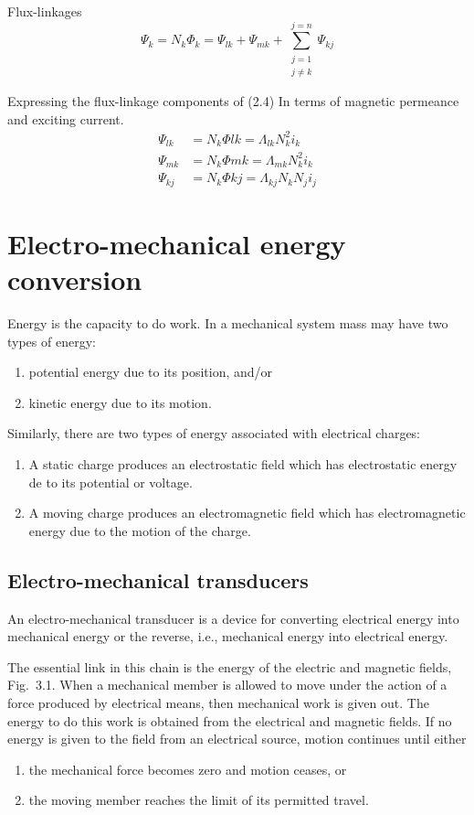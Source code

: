 \documentclass[a4paper,numbers=noenddot,12pt]{scrbook}
\begin{document}
Flux-linkages
\begin{equation}
    \varPsi_k = N_k \Phi_k = \varPsi_{lk} + \varPsi_{mk} + \sum_{\substack{j = 1\\j \neq k}}^{j = n} \varPsi_{kj}
    \label{eq:Eq2.4}
\end{equation}

Expressing the flux-linkage components of (2.4) In terms of magnetic permeance and exciting current.
\begin{align}
    \varPsi_{lk} & = N_k \Phi{lk} = \Lambda_{lk} N_k^2 i_k \\
    \varPsi_{mk} & = N_k \Phi{mk} = \Lambda_{mk} N_k^2 i_k \\
    \varPsi_{kj} & = N_k \Phi{kj} = \Lambda_{kj} N_k N_j i_j
    \label{eq_Eq2.7}
\end{align}



\chapter{Electro-mechanical energy conversion}
Energy is the capacity to do work. In a mechanical system mass may have two types of energy:
\begin{enumerate}
    \item potential energy due to its position, and/or
    \item kinetic energy due to its motion.
\end{enumerate}

Similarly, there are two types of energy associated with electrical charges:
\begin{enumerate}
    \item A static charge produces an electrostatic field which has electrostatic energy de to its potential or voltage.
    \item A moving charge produces an electromagnetic field which has electromagnetic energy due to the motion of the charge.
\end{enumerate}

\section{Electro-mechanical transducers}
An electro-mechanical transducer is a device for converting electrical energy into mechanical energy or the reverse, i.e., mechanical energy into electrical energy.

The essential link in this chain is the energy of the electric and magnetic fields, Fig.\ 3.1. When a mechanical member is allowed to move under the action of a force produced by electrical means, then mechanical work is given out. The energy to do this work is obtained from the electrical and magnetic fields. If no energy is given to the field from an electrical source, motion continues until either
\begin{enumerate}
    \item the mechanical force becomes zero and motion ceases, or
    \item the moving member reaches the limit of its permitted travel.
\end{enumerate}
\end{document}
